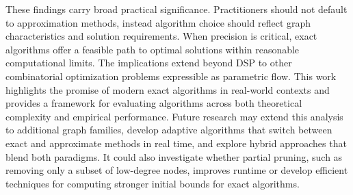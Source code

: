 These findings carry broad practical significance.
Practitioners should not default to approximation methods, instead algorithm choice should reflect graph characteristics and solution requirements.
When precision is critical, exact algorithms offer a feasible path to optimal solutions within reasonable computational limits.
The implications extend beyond DSP to other combinatorial optimization problems expressible as parametric flow.
This work highlights the promise of modern exact algorithms in real-world contexts and provides a framework for evaluating algorithms across both theoretical complexity and empirical performance.
Future research may extend this analysis to additional graph families, develop adaptive algorithms that switch between exact and approximate methods in real time, and explore hybrid approaches that blend both paradigms.
It could also investigate whether partial pruning, such as removing only a subset of low-degree nodes, improves runtime or develop efficient techniques for computing stronger initial bounds for exact algorithms.
